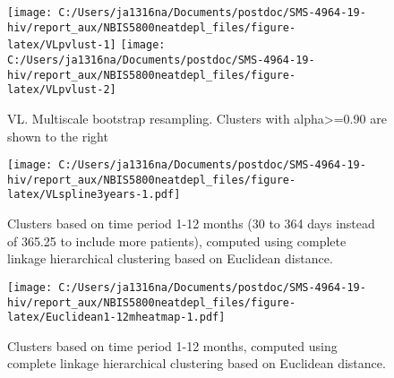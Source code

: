 \documentclass[
]{article}
\begin{document}
\begin{figure}
\texttt{[image: C:/Users/ja1316na/Documents/postdoc/SMS-4964-19-hiv/report\_aux/NBIS5800neatdepl\_files/figure-latex/VLpvlust-1]} \texttt{[image: C:/Users/ja1316na/Documents/postdoc/SMS-4964-19-hiv/report\_aux/NBIS5800neatdepl\_files/figure-latex/VLpvlust-2]} \caption{VL. Multiscale bootstrap resampling. Clusters with alpha>=0.90 are shown to the right}\label{fig:VLpvlust}
\end{figure}

\begin{figure}
\centering
\texttt{[image: C:/Users/ja1316na/Documents/postdoc/SMS-4964-19-hiv/report\_aux/NBIS5800neatdepl\_files/figure-latex/VLspline3years-1.pdf]}
\caption{\label{fig:VLspline3years}Clusters based on time period 1-12 months (30 to 364 days instead of 365.25 to include more patients), computed using complete linkage hierarchical clustering based on Euclidean distance.}
\end{figure}

\begin{figure}
\centering
\texttt{[image: C:/Users/ja1316na/Documents/postdoc/SMS-4964-19-hiv/report\_aux/NBIS5800neatdepl\_files/figure-latex/Euclidean1-12mheatmap-1.pdf]}
\caption{\label{fig:Euclidean1-12mheatmap}Clusters based on time period 1-12 months, computed using complete linkage hierarchical clustering based on Euclidean distance.}
\end{figure}
\end{document}
